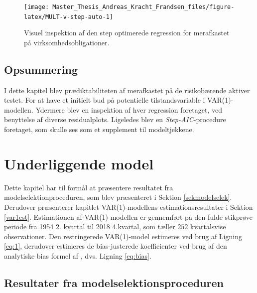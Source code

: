 \documentclass[
  a4paper,
  oneside]{memoir}
\begin{document}
\begin{figure}[H]

{\centering \texttt{[image: Master\_Thesis\_Andreas\_Kracht\_Frandsen\_files/figure-latex/MULT-v-step-auto-1]} 

}

\caption{Visuel inspektion af den step optimerede regression for merafkastet på virksomhedsobligationer.}\label{fig:MULT-v-step-auto}
\end{figure}

\hypertarget{opsreg}{%
\section{Opsummering}\label{opsreg}}

I dette kapitel blev prædiktabiliteten af merafkastet på de risikobærende aktiver testet. For at have et initielt bud på potentielle tilstandsvariable i VAR(1)-modellen. Ydermere blev en inspektion af hver regression foretaget, ved benyttelse af diverse residualplots. Ligeledes blev en \emph{Step-AIC}-procedure foretaget, som skulle ses som et supplement til modeltjekkene.

\hypertarget{underligmodel}{%
\chapter{Underliggende model}\label{underligmodel}}

Dette kapitel har til formål at præsentere resultatet fra modelselektionproceduren, som blev præsenteret i Sektion \ref{sekmodelselek}. Derudover præsenterer kapitlet VAR(1)-modellens estimationsresultater i Sektion \ref{var1est}. Estimationen af VAR(1)-modellen er gennemført på den fulde stikprøve periode fra 1954 2. kvartal til 2018 4.kvartal, som tæller \(252\) kvartalsvise observationer. Den restringerede VAR(1)-model estimeres ved brug af Ligning \eqref{eq:1}, derudover estimeres de bias-justerede koefficienter ved brug af den analytiske bias formel af \citep{Pope1990}, dvs. Ligning \eqref{eq:bias}.

\hypertarget{resframodelsel}{%
\section{Resultater fra modelselektionsproceduren}\label{resframodelsel}}
\end{document}

